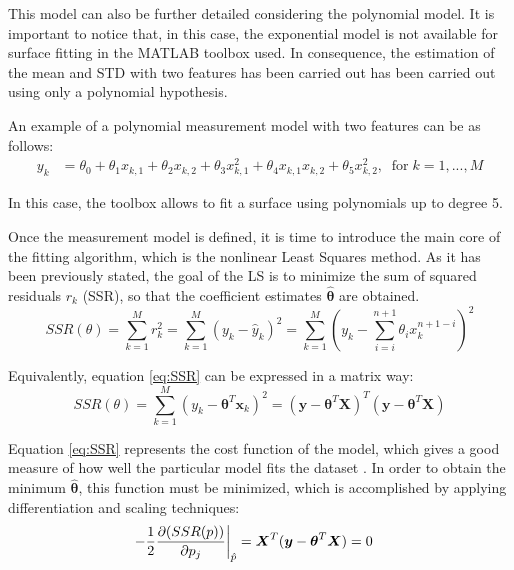 \documentclass[a4paper, report, oneside, UKenglish]{memoir}
\newcommand{\x}{\boldsymbol{x}}
\newcommand{\bX}{\boldsymbol{X}}
\newcommand{\by}{\boldsymbol{y}}
\newcommand{\btheta}{\boldsymbol{\theta}}
\begin{document}
This model can also be further detailed considering the polynomial model. It is important to notice that, in this case, the exponential model is not available for surface fitting in the MATLAB toolbox used. In consequence, the estimation of the mean and STD with two features has been carried out has been carried out using only a polynomial hypothesis.

An example of a polynomial measurement model with two features can be as follows:
\begin{equation}
\begin{split}
    y_k &= \theta_{0} + \theta_{1}x_{k,1} + \theta_{2}x_{k,2} + \theta_{3}x^{2}_{k,1} + \theta_{4}x_{k,1}x_{k,2} + \theta_{5}x^{2}_{k,2},    \;\;\mbox{for}\; k = 1,...,M
\end{split}
\end{equation}

In this case, the toolbox allows to fit a surface using polynomials up to degree 5. 

Once the measurement model is defined, it is time to introduce the main core of the fitting algorithm, which is the nonlinear Least Squares method. As it has been previously stated, the goal of the LS is to minimize the sum of squared residuals $r_k$ (SSR), so that the coefficient estimates $\hat{\btheta}$ are obtained.
\begin{equation}\label{eq:SSR}
    SSR(\theta) = \sum\limits_{k=1}^{M}{r}_{k}^{2} = \sum\limits_{k=1}^{M}(y_k - \hat{y}_k)^2 = \sum\limits_{k=1}^{M}(y_k - \sum\limits_{i=i}^{n+1} \theta_{i}x^{n+1-i}_k)^2
\end{equation}

Equivalently, equation \eqref{eq:SSR} can be expressed in a matrix way:
\begin{equation}
    SSR(\theta) = \sum\limits_{k=1}^{M}(y_k - \btheta^T\x_k)^2 = (\by - \btheta^T\bX)^T(\by - \btheta^T\bX)
\end{equation}

Equation \eqref{eq:SSR} represents the cost function of the model, which gives a good measure of how well the particular model fits the dataset \cite{MachLearnRefined}. In order to obtain the minimum $\hat{\btheta}$, this function must be minimized, which is accomplished by applying differentiation and scaling techniques:
\begin{equation}
\begin{split}
    \left.-\frac{1}{2}\pdv{(SSR(p))}{p_{j}}\right|_{\substack{\hat{p}}} &= \bX^{T}(\by - \btheta^T\bX) = 0
\end{split}
\end{equation}
\end{document}
